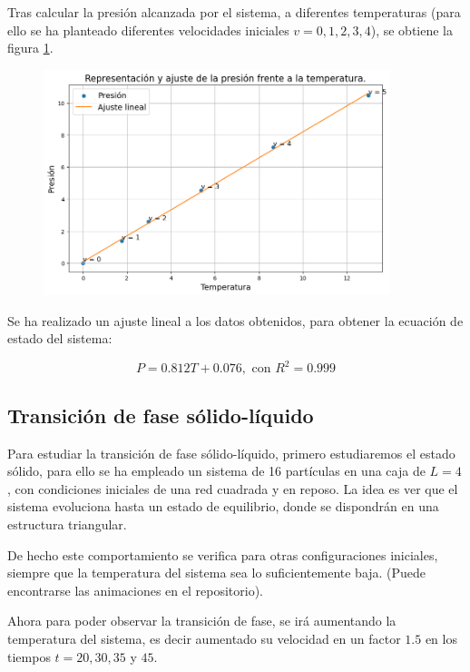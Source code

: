 \documentclass[11pt, twoside]{article} %
\begin{document}
Tras calcular la presión alcanzada por el sistema, a diferentes temperaturas (para ello
se ha planteado diferentes velocidades iniciales $v = 0, 1, 2, 3, 4$), se obtiene la 
figura \ref{fig:ecuacion_estado}.

\begin{figure}[h!]
    \centering
    \includegraphics[width=0.9\textwidth]{plots/ajuste_presion.png}
    \caption{}
    \label{fig:ecuacion_estado}
\end{figure}

Se ha realizado un ajuste lineal a los datos obtenidos, para obtener la ecuación de
estado del sistema:

\begin{equation}
    P = 0.812 T + 0.076, \text{ con } R^2 = 0.999
\end{equation}


\subsection{Transición de fase sólido-líquido}
Para estudiar la transición de fase sólido-líquido, primero estudiaremos el estado
sólido, para ello se ha empleado un sistema de 16 partículas en una caja de 
$L=4$, con condiciones iniciales de una red cuadrada y en reposo. La idea es ver 
que el sistema evoluciona hasta un estado de equilibrio, donde se dispondrán 
en una estructura triangular.


De hecho este comportamiento se verifica para otras configuraciones iniciales, 
siempre que la temperatura del sistema sea lo suficientemente baja. (Puede encontrarse
las animaciones en el repositorio).

Ahora para poder observar la transición de fase, se irá aumentando la temperatura 
del sistema, es decir aumentado su velocidad en un factor $1.5$ en los tiempos 
$t=20, 30, 35$ y $45$. 
\end{document}
